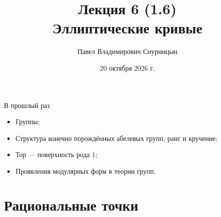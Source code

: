 \documentclass[serif, aspectratio=169]{beamer}
\author{Павел Владимирович Снурницын}
\title{Лекция 6 (1.6)\\ Эллиптические кривые}
\institute{к.ф.-м.н., с.н.с., ИБ ВМК}
\date{\small 20 октября 2026 г.}
\begin{document}
\begin{frame}
    \titlepage
\end{frame}
\note{}

\begin{frame}{В прошлый раз}
    \begin{itemize}
            \item Группы;
            \item Структура конечно порождённых абелевых групп, ранг и кручение;
            \item Тор --- поверхность рода $1$;
            \item Проявления модулярных форм в теории групп.
    \end{itemize}
    \note{
        \begin{itemize}
            \item ---
        \end{itemize}
    }
\end{frame}

\section{Рациональные точки}
\end{document}
